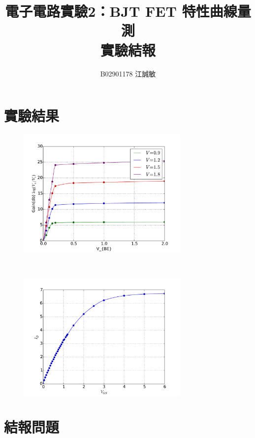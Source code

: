 \documentclass[12pt, a4paper]{article}
\title{ \bf {\Huge 電子電路實驗2：BJT FET 特性曲線量測 }\\ 實驗結報}
\author{B02901178 江誠敏}
\begin{document}
\maketitle


\section{實驗結果}
\begin{figure}[H]
\begin{center}
  \includegraphics[width=0.75\textwidth]{fig1.pdf}
\end{center}
\caption{}
\label{fig:}
\end{figure}
~
\begin{figure}[H]
\begin{center}
  \includegraphics[width=0.75\textwidth]{fig2.pdf}
\end{center}
\caption{}
\label{fig:}
\end{figure}

\section{結報問題}
\end{document}
